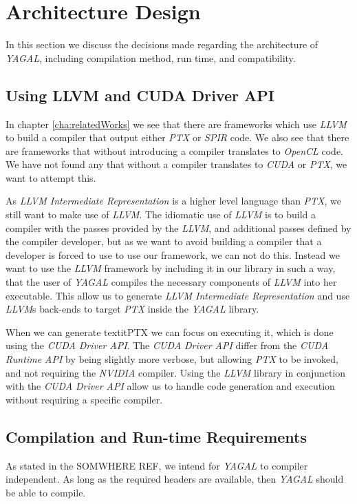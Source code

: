 \section{Architecture Design}
In this section we discuss the decisions made regarding the architecture of \textit{YAGAL}, including compilation method, run time, and compatibility.

\subsection{Using LLVM and CUDA Driver API}
In chapter \ref{cha:relatedWorks} we see that there are frameworks which use \textit{LLVM} to build a compiler that output either \textit{PTX} or \textit{SPIR} code. We also see that there are frameworks that without introducing a compiler translates to \textit{OpenCL} code. We have not found any that without a compiler translates to \textit{CUDA} or \textit{PTX}, we want to attempt this.

As \textit{LLVM Intermediate Representation} is a higher level language than \textit{PTX}, we still want to make use of \textit{LLVM}. The idiomatic use of \textit{LLVM} is to build a compiler with the passes provided by the \textit{LLVM}, and additional passes defined by the compiler developer, but as we want to avoid building a compiler that a developer is forced to use to use our framework, we can not do this. Instead we want to use the \textit{LLVM} framework by including it in our library in such a way, that the user of \textit{YAGAL} compiles the necessary components of \textit{LLVM} into her executable. This allow us to generate \textit{LLVM Intermediate Representation} and use \textit{LLVM}s back-ends to target \textit{PTX} inside the \textit{YAGAL} library.

When we can generate textit{PTX} we can focus on executing it, which is done using the \textit{CUDA Driver API}. The \textit{CUDA Driver API} differ from the \textit{CUDA Runtime API} by being slightly more verbose, but allowing \textit{PTX} to be invoked, and not requiring the \textit{NVIDIA} compiler. Using the \textit{LLVM} library in conjunction with the \textit{CUDA Driver API} allow us to handle code generation and execution without requiring a specific compiler.

\subsection{Compilation and Run-time Requirements}
As stated in the SOMWHERE REF, we intend for \textit{YAGAL} to compiler independent. As long as the required headers are available, then \textit{YAGAL} should be able to compile. 

